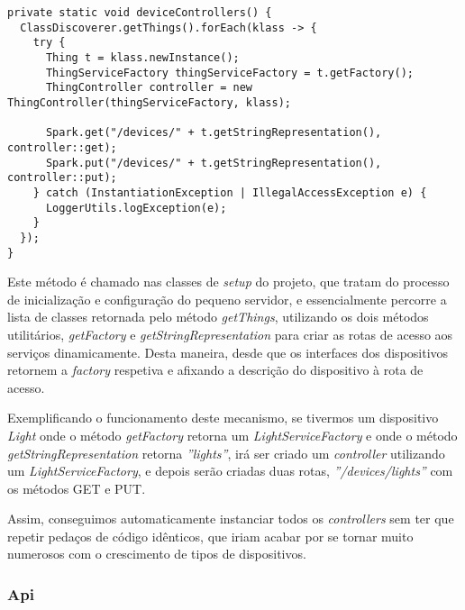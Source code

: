 \begin{verbatim}
private static void deviceControllers() {
  ClassDiscoverer.getThings().forEach(klass -> {
    try {
      Thing t = klass.newInstance();
      ThingServiceFactory thingServiceFactory = t.getFactory();
      ThingController controller = new ThingController(thingServiceFactory, klass);

      Spark.get("/devices/" + t.getStringRepresentation(), controller::get);
      Spark.put("/devices/" + t.getStringRepresentation(), controller::put);
    } catch (InstantiationException | IllegalAccessException e) {
      LoggerUtils.logException(e);
    }
  });
}
\end{verbatim}

Este método é chamado nas classes de \textit{setup} do projeto, que tratam do processo de inicialização e configuração do pequeno servidor, e essencialmente percorre a lista de classes retornada pelo método \textit{getThings}, utilizando os dois métodos utilitários, \textit{getFactory} e \textit{getStringRepresentation} para criar as rotas de acesso aos serviços dinamicamente. Desta maneira, desde que os interfaces dos dispositivos retornem a \textit{factory} respetiva e afixando a descrição do dispositivo à rota de acesso.

Exemplificando o funcionamento deste mecanismo, se tivermos um dispositivo \textit{Light} onde o método \textit{getFactory} retorna um \textit{LightServiceFactory} e onde o método \textit{getStringRepresentation} retorna \textit{''lights''}, irá ser criado um \textit{controller} utilizando um \textit{LightServiceFactory}, e depois serão criadas duas rotas, \textit{''/devices/lights''} com os métodos GET e PUT.

Assim, conseguimos automaticamente instanciar todos os \textit{controllers} sem ter que repetir pedaços de código idênticos, que iriam acabar por se tornar muito numerosos com o crescimento de tipos de dispositivos.

\subsubsection{Api}